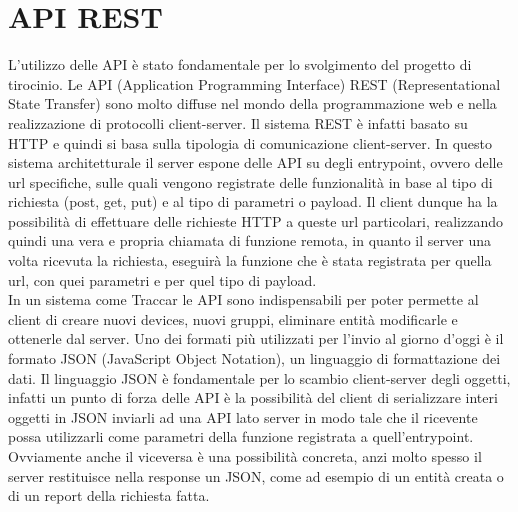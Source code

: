 \documentclass[a4paper,titlepage,12pt]{report}
\begin{document}
{{\section{
API REST}
L'utilizzo delle API è stato fondamentale per lo svolgimento del progetto di tirocinio. Le API (Application Programming Interface) REST (Representational State Transfer) sono molto diffuse nel mondo della programmazione web e nella realizzazione di protocolli client-server. Il sistema REST è infatti basato su HTTP e quindi si basa sulla tipologia di comunicazione client-server. In questo sistema architetturale il server espone delle API su degli entrypoint, ovvero delle url specifiche, sulle quali vengono registrate delle funzionalità in base al tipo di richiesta (post, get, put) e al tipo di parametri o payload. Il client dunque ha la possibilità di effettuare delle richieste HTTP a queste url particolari, realizzando quindi una vera e propria chiamata di funzione remota, in quanto il server una volta ricevuta la richiesta, eseguirà la funzione che è stata registrata per quella url, con quei parametri e per quel tipo di payload. \\
In un sistema come Traccar le API sono indispensabili per poter permette al client di creare nuovi devices, nuovi gruppi, eliminare entità modificarle e ottenerle dal server. Uno dei formati più utilizzati per l'invio al giorno d'oggi è il formato JSON (JavaScript Object Notation), un linguaggio di formattazione dei dati. Il linguaggio JSON è fondamentale per lo scambio client-server degli oggetti, infatti un punto di forza delle API è la possibilità del client di serializzare interi oggetti in JSON inviarli ad una API lato server in modo tale che il ricevente possa utilizzarli come parametri della funzione registrata a quell'entrypoint. Ovviamente anche il viceversa è una possibilità concreta, anzi molto spesso il server restituisce nella response un JSON, come ad esempio di un entità creata o di un report della richiesta fatta.
}





}
\end{document}

